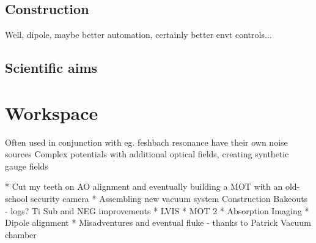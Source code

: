 \subsection*{Construction}

Well, dipole, maybe better automation, certainly better envt controls...
	
\subsection*{Scientific aims}

\section*{Workspace}


		
	Often used in conjunction with eg.
	feshbach resonance 
	have their own noise sources
		\cite{pichler10}%
	Complex potentials with additional optical fields, creating synthetic gauge fields
		\cite{aidelsburger11,aidelsburger13,miyake13}


* Cut my teeth on AO alignment and eventually building
a MOT with an old-school security camera * Assembling new vacuum system
Construction Bakeouts - logs? Ti Sub and NEG improvements * LVIS * MOT 2
* Absorption Imaging * Dipole alignment * Misadventures and eventual
fluke - thanks to Patrick
Vacuum chamber

